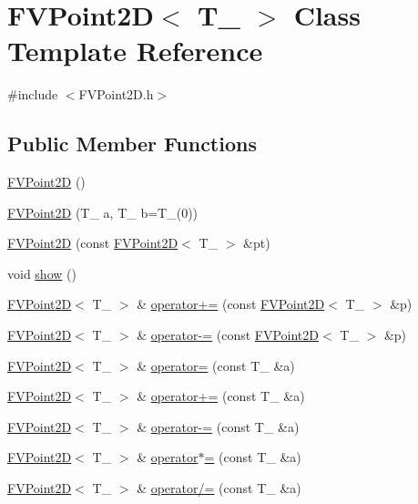 \hypertarget{classFVPoint2D}{
\section{FVPoint2D$<$ T\_\- $>$ Class Template Reference}
\label{d7/dbe/classFVPoint2D}
}


{\ttfamily \#include $<$FVPoint2D.h$>$}

\subsection*{Public Member Functions}
\begin{DoxyCompactItemize}
\item 
\hyperlink{classFVPoint2D_ae7981e40133aa9f3b34864eea7114a1e}{FVPoint2D} ()
\item 
\hyperlink{classFVPoint2D_a1757c4113ad88ca8476d801b52aa73e1}{FVPoint2D} (T\_\- a, T\_\- b=T\_\-(0))
\item 
\hyperlink{classFVPoint2D_add721bc3550deb4a10e1f5a45a59e3be}{FVPoint2D} (const \hyperlink{classFVPoint2D}{FVPoint2D}$<$ T\_\- $>$ \&pt)
\item 
void \hyperlink{classFVPoint2D_a4b148f40a95444d5669406b918ad2f52}{show} ()
\item 
\hyperlink{classFVPoint2D}{FVPoint2D}$<$ T\_\- $>$ \& \hyperlink{classFVPoint2D_a0bac70bc25580fbeba1c6bf8b4b77eeb}{operator+=} (const \hyperlink{classFVPoint2D}{FVPoint2D}$<$ T\_\- $>$ \&p)
\item 
\hyperlink{classFVPoint2D}{FVPoint2D}$<$ T\_\- $>$ \& \hyperlink{classFVPoint2D_a24ac22e6e0d73b10754af8fa357ee1f2}{operator-\/=} (const \hyperlink{classFVPoint2D}{FVPoint2D}$<$ T\_\- $>$ \&p)
\item 
\hyperlink{classFVPoint2D}{FVPoint2D}$<$ T\_\- $>$ \& \hyperlink{classFVPoint2D_a53f2787c386788eed76e7009cca9709e}{operator=} (const T\_\- \&a)
\item 
\hyperlink{classFVPoint2D}{FVPoint2D}$<$ T\_\- $>$ \& \hyperlink{classFVPoint2D_abf33e6a38a6f20b9eba1e2bd95e0135f}{operator+=} (const T\_\- \&a)
\item 
\hyperlink{classFVPoint2D}{FVPoint2D}$<$ T\_\- $>$ \& \hyperlink{classFVPoint2D_a1279d535f884f5a79c0dcb602e189150}{operator-\/=} (const T\_\- \&a)
\item 
\hyperlink{classFVPoint2D}{FVPoint2D}$<$ T\_\- $>$ \& \hyperlink{classFVPoint2D_af5cf385add2a21b868fc731aa9d906d5}{operator$\ast$=} (const T\_\- \&a)
\item 
\hyperlink{classFVPoint2D}{FVPoint2D}$<$ T\_\- $>$ \& \hyperlink{classFVPoint2D_a48ace6c16d9bcfbef352efeb9a812eb1}{operator/=} (const T\_\- \&a)
\end{DoxyCompactItemize}
